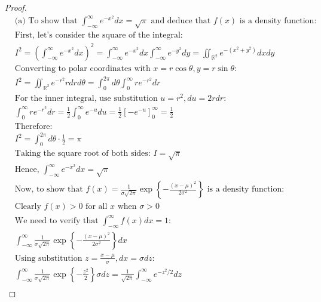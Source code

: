\documentclass[letterpaper, 11pt]{article}
\newcommand{\1}{\mathds{1}}	%
\theoremstyle{definition}
\begin{document}
    \begin{proof}
        \begin{align*}
            &\text{(a) To show that } \int_{-\infty}^{\infty} e^{-x^2} dx = \sqrt{\pi} \text{ and deduce that } f(x) \text{ is a density function:}\\
            &\text{First, let's consider the square of the integral:}\\
            &I^2 = \left(\int_{-\infty}^{\infty} e^{-x^2} dx\right)^2 = \int_{-\infty}^{\infty} e^{-x^2} dx \int_{-\infty}^{\infty} e^{-y^2} dy = \iint_{\mathbb{R}^2} e^{-(x^2+y^2)} dx dy\\
            &\text{Converting to polar coordinates with } x = r\cos\theta, y = r\sin\theta:\\
            &I^2 = \iint_{\mathbb{R}^2} e^{-r^2} r dr d\theta = \int_{0}^{2\pi} d\theta \int_{0}^{\infty} r e^{-r^2} dr\\
            &\text{For the inner integral, use substitution } u = r^2, du = 2r dr:\\
            &\int_{0}^{\infty} r e^{-r^2} dr = \frac{1}{2}\int_{0}^{\infty} e^{-u} du = \frac{1}{2}[-e^{-u}]_{0}^{\infty} = \frac{1}{2}\\
            &\text{Therefore:}\\
            &I^2 = \int_{0}^{2\pi} d\theta \cdot \frac{1}{2} = \pi\\
            &\text{Taking the square root of both sides: } I = \sqrt{\pi}\\
            &\text{Hence, } \int_{-\infty}^{\infty} e^{-x^2} dx = \sqrt{\pi}\\
            &\text{Now, to show that } f(x) = \frac{1}{\sigma\sqrt{2\pi}} \exp\left\{-\frac{(x-\mu)^2}{2\sigma^2}\right\} \text{ is a density function:}\\
            &\text{Clearly } f(x) > 0 \text{ for all } x \text{ when } \sigma > 0\\
            &\text{We need to verify that } \int_{-\infty}^{\infty} f(x) dx = 1:\\
            &\int_{-\infty}^{\infty} \frac{1}{\sigma\sqrt{2\pi}} \exp\left\{-\frac{(x-\mu)^2}{2\sigma^2}\right\} dx\\
            &\text{Using substitution } z = \frac{x-\mu}{\sigma}, dx = \sigma dz:\\
            &\int_{-\infty}^{\infty} \frac{1}{\sigma\sqrt{2\pi}} \exp\left\{-\frac{z^2}{2}\right\} \sigma dz = \frac{1}{\sqrt{2\pi}} \int_{-\infty}^{\infty} e^{-z^2/2} dz\\

\end{align*}
\end{proof}
\end{document}

